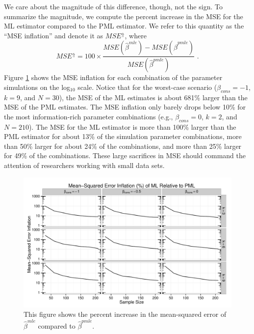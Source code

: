 \documentclass[12pt]{article}
\begin{document}
We care about the magnitude of this difference, though, not the sign.
To summarize the magnitude, we compute the percent increase in the MSE for the ML estimator compared to the PML estimator. 
We refer to this quantity as the ``MSE inflation'' and denote it as $MSE^\Uparrow$, where
\begin{equation}\label{eqn:mse-infl}
MSE^\Uparrow = 100 \times \dfrac{MSE(\hat{\beta}^{mle}) - MSE(\hat{\beta}^{pmle})}{MSE(\hat{\beta}^{pmle})}  \text{ .}
\end{equation}
Figure \ref{fig:mse-infl} shows the MSE inflation for each combination of the parameter simulations on the log$_{10}$ scale.
Notice that for the worst-case scenario ($\beta_{cons} = -1$, $k = 9$, and $N = 30$), the MSE of the ML estimates is about 681\% larger than the MSE of the PML estimates.
The MSE inflation only barely drops below 10\% for the most information-rich parameter combinations (e.g., $\beta_{cons} = 0$, $k = 2$, and $N = 210$).
The MSE for the ML estimator is more than 100\% larger than the PML estimator for about 13\% of the simulation parameter combinations, more than 50\% larger for about 24\% of the combinations, and more than 25\% larger for 49\% of the combinations.
These large sacrifices in MSE should command the attention of researchers working with small data sets.

\begin{figure}[h]
\begin{center}
\includegraphics[width = \textwidth]{figs/sims-mse-infl.pdf}
\caption{This figure shows the percent increase in the mean-squared error of $\hat{\beta}^{mle}$ compared to $\hat{\beta}^{pmle}$.}\label{fig:mse-infl}
\end{center}
\end{figure}
\end{document}
